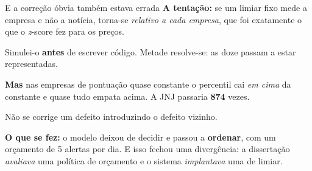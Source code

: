 \documentclass[aspectratio=169]{beamer}
\begin{document}
\begin{frame}{E a correção óbvia também estava errada}
\textbf{A tentação:} se um limiar fixo mede a empresa e não a notícia, torna-se \emph{relativo a
cada empresa}, que foi exatamente o que o \emph{z}-score fez para os preços.
\vspace{3mm}

Simulei-o \textbf{antes} de escrever código. Metade resolve-se: as doze passam a estar
representadas.
\vspace{2mm}

\textbf{Mas} nas empresas de pontuação quase constante o percentil cai \emph{em cima} da constante
e quase tudo empata acima. A JNJ passaria \textbf{874} vezes.
\vspace{3mm}
\begin{center}
\large Não se corrige um defeito introduzindo o defeito vizinho.
\end{center}
\vspace{3mm}
\footnotesize
\textbf{O que se fez:} o modelo deixou de decidir e passou a \textbf{ordenar}, com um orçamento de
5 alertas por dia. E isso fechou uma divergência: a dissertação \emph{avaliava} uma política de
orçamento e o sistema \emph{implantava} uma de limiar.
\end{frame}
\end{document}
